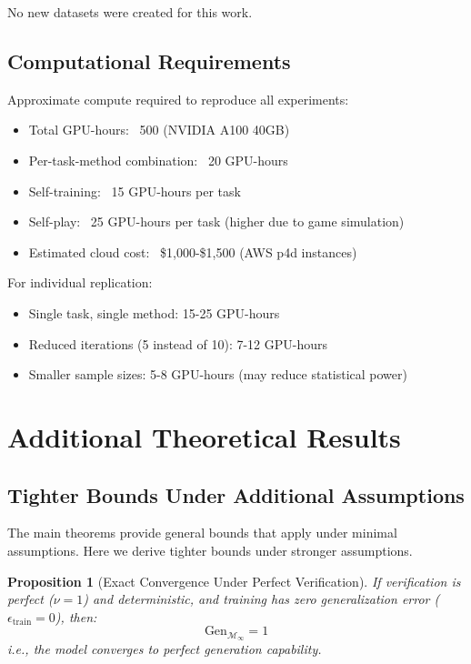 \documentclass{article}
\newtheorem{proposition}[theorem]{Proposition}
\theoremstyle{definition}
\theoremstyle{remark}
\newcommand{\M}{\mathcal{M}}
\newcommand{\Gen}{\text{Gen}}
\begin{document}
No new datasets were created for this work.

\subsection{Computational Requirements}

Approximate compute required to reproduce all experiments:
\begin{itemize}
\item Total GPU-hours: ~500 (NVIDIA A100 40GB)
\item Per-task-method combination: ~20 GPU-hours
\item Self-training: ~15 GPU-hours per task
\item Self-play: ~25 GPU-hours per task (higher due to game simulation)
\item Estimated cloud cost: ~\$1,000-\$1,500 (AWS p4d instances)
\end{itemize}

For individual replication:
\begin{itemize}
\item Single task, single method: 15-25 GPU-hours
\item Reduced iterations (5 instead of 10): 7-12 GPU-hours
\item Smaller sample sizes: 5-8 GPU-hours (may reduce statistical power)
\end{itemize}

\section{Additional Theoretical Results}
\label{sec:additional-theory}

\subsection{Tighter Bounds Under Additional Assumptions}

The main theorems provide general bounds that apply under minimal assumptions. Here we derive tighter bounds under stronger assumptions.

\begin{proposition}[Exact Convergence Under Perfect Verification]
\label{prop:exact-convergence}
If verification is perfect (\(\nu = 1\)) and deterministic, and training has zero generalization error (\(\epsilon_{\text{train}} = 0\)), then:
\[
\Gen_{\M_\infty} = 1
\]
i.e., the model converges to perfect generation capability.
\end{proposition}
\end{document}
